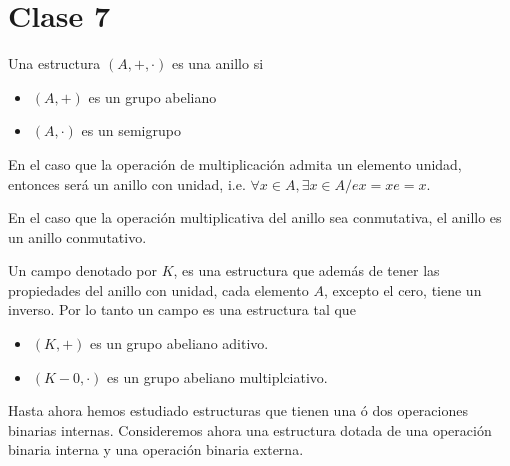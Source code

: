\section{Clase 7}
\begin{defi}
	Una estructura $(A,+,\cdot)$ es una anillo si
	\begin{itemize}
		\item $(A,+)$ es un grupo abeliano
		\item $(A,\cdot)$ es un semigrupo
	\end{itemize}
\end{defi}

En el caso que la operación de multiplicación admita un elemento unidad, entonces \anillo será un anillo con unidad, i.e. $\forall x\in A, \exists x\in A / ex=xe=x$.

En el caso que la operación multiplicativa del anillo sea conmutativa, el anillo es un anillo conmutativo.

\begin{defi}
	Un campo denotado por $K$, es una estructura que además de tener las propiedades del anillo con unidad, cada elemento $A$, excepto el cero, tiene un inverso. Por lo tanto un campo \campo es una estructura tal que
	\begin{itemize}
		\item $(K,+)$ es un grupo abeliano aditivo.
		\item $(K-0, \cdot)$ es un grupo abeliano multiplciativo.
	\end{itemize}
\end{defi}

Hasta ahora hemos estudiado estructuras que tienen una ó dos operaciones binarias internas. Consideremos ahora una estructura dotada de una operación binaria interna y una operación binaria externa.

